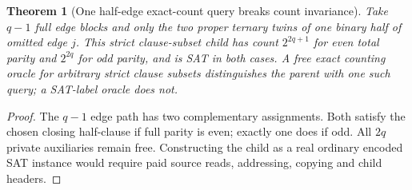 \documentclass[11pt]{article}
\newtheorem{theorem}{Theorem}
\begin{document}
\begin{theorem}[One half-edge exact-count query breaks count invariance]
Take $q-1$ full edge blocks and only the two proper ternary twins of \emph{one binary half} of omitted edge $j$. This strict clause-subset child has count $2^{2q+1}$ for even total parity and $2^{2q}$ for odd parity, and is SAT in both cases. A free exact counting oracle for \emph{arbitrary} strict clause subsets distinguishes the parent with one such query; a SAT-label oracle does not.
\end{theorem}
\begin{proof}
The $q-1$ edge path has two complementary assignments. Both satisfy the chosen closing half-clause if full parity is even; exactly one does if odd. All $2q$ private auxiliaries remain free. Constructing the child as a real ordinary encoded SAT instance would require paid source reads, addressing, copying and child headers.
\end{proof}
\end{document}

